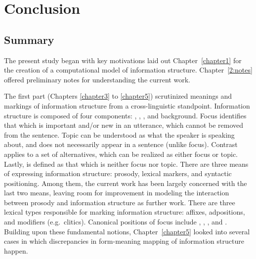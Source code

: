 \chapter{Conclusion}
\label{chapter15}
\setcounter{enums}{0}

\section{Summary}
\label{15:sec:summary}


The present study began with key motivations laid out
Chapter~\ref{chapter1} for the creation of a computational model of
information structure. Chapter~\ref{2:notes} offered preliminary notes
for understanding the current work.

The first part (Chapters \ref{chapter3} to \ref{chapter5}) scrutinized
meanings and markings of information structure from a cross-linguistic
standpoint. Information structure is composed of four components:
, , , and background. Focus
identifies that which is important and/or new in an utterance, which
cannot be removed from the sentence. Topic can be understood as what
the speaker is speaking about, and does not necessarily appear in a
sentence (unlike focus). Contrast applies to a set of
alternatives, which can be realized as either
focus or topic. Lastly,  is defined as that which is
neither focus nor topic. There are three means of expressing
information structure: prosody, lexical
markers, and syntactic positioning. Among them, the current work has been largely concerned
with the last two means, leaving room for improvement in modeling the
interaction between prosody and information structure as further work.
There are three lexical types responsible for marking information
structure: affixes, adpositions, and modifiers
(e.g.\ clitics). Canonical positions of focus include
, , , and
. Building upon these fundamental notions,
Chapter~\ref{chapter5} looked into several cases in which
discrepancies in form-meaning mapping of information structure happen.


